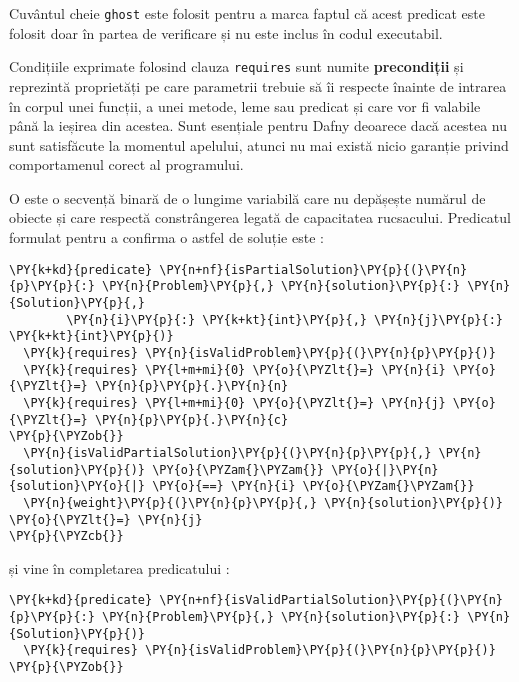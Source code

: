 \begin{sloppypar}
\par Cuvântul cheie \texttt{ghost} este folosit pentru a marca faptul că acest predicat este folosit doar în partea de verificare și nu este inclus în codul executabil. \cite{leino2021dafny}
\par Condițiile exprimate folosind clauza \texttt{requires} sunt numite \textbf{precondiții} și reprezintă proprietăți pe care parametrii trebuie să îi respecte înainte de intrarea în corpul unei funcții, a unei metode, leme sau predicat și care vor fi valabile până la ieșirea din acestea. \cite{DBLP:series/natosec/KoenigL12} Sunt esențiale pentru Dafny deoarece dacă acestea nu sunt satisfăcute la momentul apelului, atunci nu mai există nicio garanție privind comportamenul corect al programului.

\par O  este o secvență binară de o lungime variabilă care nu depășește numărul de obiecte și care respectă constrângerea legată de capacitatea rucsacului. Predicatul formulat pentru a confirma o astfel de soluție este :
    \begin{Verbatim}[commandchars=\\\{\}]
\PY{k+kd}{predicate} \PY{n+nf}{isPartialSolution}\PY{p}{(}\PY{n}{p}\PY{p}{:} \PY{n}{Problem}\PY{p}{,} \PY{n}{solution}\PY{p}{:} \PY{n}{Solution}\PY{p}{,} 
        \PY{n}{i}\PY{p}{:} \PY{k+kt}{int}\PY{p}{,} \PY{n}{j}\PY{p}{:} \PY{k+kt}{int}\PY{p}{)}
  \PY{k}{requires} \PY{n}{isValidProblem}\PY{p}{(}\PY{n}{p}\PY{p}{)}
  \PY{k}{requires} \PY{l+m+mi}{0} \PY{o}{\PYZlt{}=} \PY{n}{i} \PY{o}{\PYZlt{}=} \PY{n}{p}\PY{p}{.}\PY{n}{n}
  \PY{k}{requires} \PY{l+m+mi}{0} \PY{o}{\PYZlt{}=} \PY{n}{j} \PY{o}{\PYZlt{}=} \PY{n}{p}\PY{p}{.}\PY{n}{c}
\PY{p}{\PYZob{}}
  \PY{n}{isValidPartialSolution}\PY{p}{(}\PY{n}{p}\PY{p}{,} \PY{n}{solution}\PY{p}{)} \PY{o}{\PYZam{}\PYZam{}} \PY{o}{|}\PY{n}{solution}\PY{o}{|} \PY{o}{==} \PY{n}{i} \PY{o}{\PYZam{}\PYZam{}}
  \PY{n}{weight}\PY{p}{(}\PY{n}{p}\PY{p}{,} \PY{n}{solution}\PY{p}{)} \PY{o}{\PYZlt{}=} \PY{n}{j}
\PY{p}{\PYZcb{}}
\end{Verbatim}
    și vine în completarea predicatului :
    \begin{Verbatim}[commandchars=\\\{\}]
\PY{k+kd}{predicate} \PY{n+nf}{isValidPartialSolution}\PY{p}{(}\PY{n}{p}\PY{p}{:} \PY{n}{Problem}\PY{p}{,} \PY{n}{solution}\PY{p}{:} \PY{n}{Solution}\PY{p}{)}
  \PY{k}{requires} \PY{n}{isValidProblem}\PY{p}{(}\PY{n}{p}\PY{p}{)}
\PY{p}{\PYZob{}}

\end{Verbatim}
\end{sloppypar}
